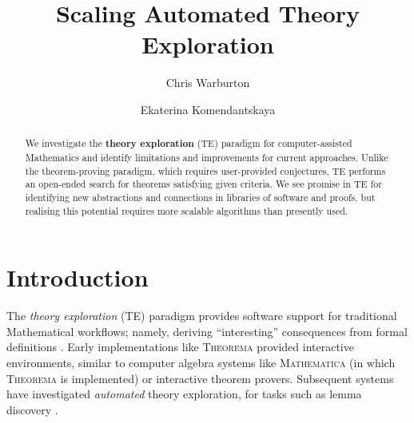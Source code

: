 \documentclass{llncs}
\begin{document}
\mainmatter              %
%
\title{Scaling Automated Theory Exploration}
%
%
\author{Chris Warburton \and Ekaterina Komendantskaya}
%
%
%

\maketitle              %

\begin{abstract}
We investigate the \textbf{theory exploration} (TE)
paradigm for computer-assisted Mathematics and identify limitations and
improvements for current approaches. Unlike the theorem-proving paradigm,
which requires user-provided conjectures, TE performs an open-ended
search for theorems satisfying given criteria. We see promise in TE for
identifying new abstractions and connections in libraries of software
and proofs, but realising this potential requires more scalable
algorithms than presently used.
\end{abstract}
%
\section{Introduction}

The \emph{theory exploration} (TE) paradigm provides software support
for traditional Mathematical workflows; namely, deriving ``interesting''
consequences from formal definitions \cite{RISC1482}. Early
implementations like \textsc{Theorema} \cite{buchberger2000theory} provided
interactive environments, similar to computer algebra systems like
\textsc{Mathematica} (in which \textsc{Theorema} is implemented) or
interactive theorem provers. Subsequent systems have investigated
\emph{automated} theory exploration, for tasks such as lemma discovery
\cite{Hipster}.
\end{document}

